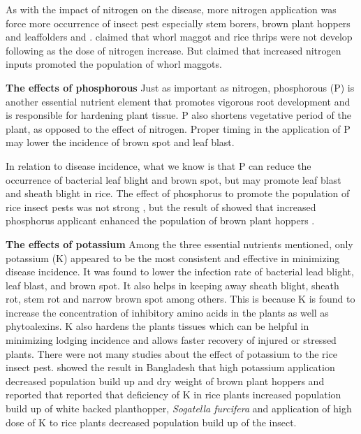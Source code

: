 As with the impact of nitrogen on the disease, more nitrogen application was force more occurrence of insect pest especially stem borers, brown plant hoppers and leaffolders \cite{chau2003impacts} and \cite{rashid2014effect}. \cite{chau2003impacts} claimed that whorl maggot and rice thrips were not develop following as the dose of nitrogen increase. But \cite{litsinger2011cultural} claimed that increased nitrogen inputs promoted the population of whorl maggots.

\textbf{The effects of phosphorous}
Just as important as nitrogen, phosphorous (P) is another essential nutrient element that promotes vigorous root development and is responsible for hardening plant tissue. P also shortens vegetative period of the plant, as opposed to the effect of nitrogen. Proper timing in the application of P may lower the incidence of brown spot and leaf blast. 

In relation to disease incidence, what we know is that P can reduce the occurrence of bacterial leaf blight and brown spot, but may promote leaf blast and sheath blight in rice. The effect of phosphorus to promote the population of rice insect pests was not strong \citet{chau2003impacts, rashid2014effect}, but the result of \cite{rashid2014effect} showed that increased phosphorus applicant enhanced the population of brown plant hoppers .

\textbf{The effects of potassium}
Among the three essential nutrients mentioned, only potassium (K) appeared to be the most consistent and effective in minimizing disease incidence. It was found to lower the infection rate of bacterial lead blight, leaf blast, and brown spot. It also helps in keeping away sheath blight, sheath rot, stem rot and narrow brown spot among others. This is because K is found to increase the concentration of inhibitory amino acids in the plants as well as phytoalexins. K also hardens the plants tissues which can be helpful in minimizing lodging incidence and allows faster recovery of injured or stressed plants. 
There were not many studies about the effect of potassium to the rice insect pest.  \cite{rashid2014effect} showed the result in Bangladesh that high potassium application decreased population build up and dry weight of brown plant hoppers and \cite{salim2002effects} reported that reported that deficiency of K in rice plants increased population build up of white backed planthopper, \textit{Sogatella furcifera} and application of high dose of K to rice plants decreased population build up of the insect.

